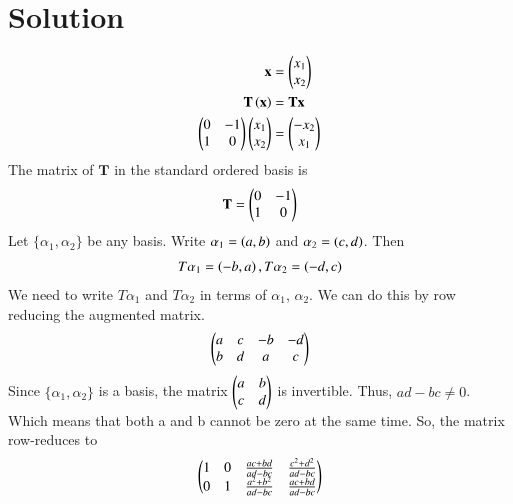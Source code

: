 \documentclass[journal,12pt,twocolumn]{IEEEtran}
\begin{document}
\section{Solution}
\begin{align}
    \mathbf{x} &= \begin{pmatrix}x_1 \\ x_2\end{pmatrix} \\
    \mathbf{T}\left(\mathbf{x}\right) &= \mathbf{T}\mathbf{x}\\
    \begin{pmatrix}0 & -1 \\ 1 & 0\end{pmatrix}\begin{pmatrix}x_1 \\ x_2\end{pmatrix} &= \begin{pmatrix}- x_2 \\ x_1\end{pmatrix}
\end{align}
The matrix of $\mathbf{T}$ in the standard ordered basis is
\begin{align}
    \mathbf{T}  = \begin{pmatrix}0 & -1 \\ 1 & 0\end{pmatrix}
\end{align}
Let $\{\alpha_1,\alpha_2\}$ be any basis. Write $\alpha_1=\left(a,b\right)$ and $\alpha_2=\left(c,d\right)$. Then 
\begin{align}
    T\alpha_1=\left(-b,a\right), T\alpha_2=\left(-d,c\right)
\end{align}
We need to write $T\alpha_1$ and $T\alpha_2$ in terms of $\alpha_1$, $\alpha_2$. We can do this by row reducing the augmented matrix.
\begin{align}
    \begin{pmatrix}a & c & -b & -d \\ b & d & a & c\end{pmatrix}
\end{align}
Since $\{\alpha_1,\alpha_2\}$ is a basis, the matrix $\begin{pmatrix}a & b \\ c & d\end{pmatrix}$ is invertible. Thus, $ad-bc \neq 0$. Which means that both a and b cannot be zero at the same time. So, the matrix row-reduces to 
\begin{align}
    \begin{pmatrix}1 & 0 & \frac{ac+bd}{ad-bc} & \frac{c^2+d^2}{ad-bc} \\ 0 & 1 & \frac{a^2+b^2}{ad-bc} & \frac{ac+bd}{ad-bc}\end{pmatrix}
\end{align}
\end{document}
